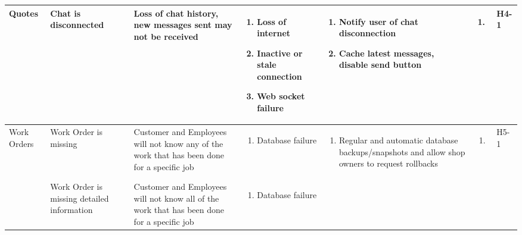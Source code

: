 \documentclass{article}
\begin{document}
\begin{landscape}
\begin{longtable}{|p{}|p{}|p{}|p{}|p{}|p{}|p{}|}
		\hline
		Quotes
		 & Chat is disconnected
		 & Loss of chat history, new messages sent may not be received
		 & \begin{enumerate}[label=\alph*., leftmargin=*]
			   \item Loss of internet
			   \item Inactive or stale connection
			   \item Web socket failure
		   \end{enumerate}
		 & \begin{enumerate}[label=\alph*., leftmargin=*]
			   \item Notify user of chat disconnection
			   \item Cache latest messages, disable send button
		   \end{enumerate}
		 & \begin{enumerate}[label=\alph*., leftmargin=*]
			   \item
		   \end{enumerate}
		 & H4-1                                                                                                         \\
		\hline
		\multirow{2}{*}{Work Orders}
		 & Work Order is missing
		 & Customer and Employees will not know any of the work that has been done for a specific job
		 & \begin{enumerate}[label=\alph*., leftmargin=*]
			   \item Database failure
		   \end{enumerate}
		 & \begin{enumerate}[label=\alph*., leftmargin=*]
			   \item Regular and automatic database backups/snapshots and allow shop owners to request rollbacks
		   \end{enumerate}
		 & \begin{enumerate}[label=\alph*., leftmargin=*]
			   \item
		   \end{enumerate}
		 & H5-1                                                                                                         \\
		\cline{2-7}
		~
		 & Work Order is missing detailed information
		 & Customer and Employees will not know all of the work that has been done for a specific job
		 & \begin{enumerate}[label=\alph*., leftmargin=*]
			   \item Database failure
		   \end{enumerate}

\end{longtable}
\end{landscape}
\end{document}

